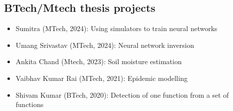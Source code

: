\documentclass[margin]{res}
\begin{document}
\begin{resume}
\section{BTech/Mtech thesis projects}

\begin{itemize}
\item Sumitra (MTech, 2024): Using simulators to train neural networks
\item Umang Srivastav (MTech, 2024): Neural network inversion
\item Ankita Chand (Mtech, 2023): Soil moisture estimation
\item Vaibhav Kumar Rai (MTech, 2021): Epidemic modelling
\item Shivam Kumar (BTech, 2020): Detection of one function from a set of functions
\end{itemize}




\end{resume}
\end{document}
